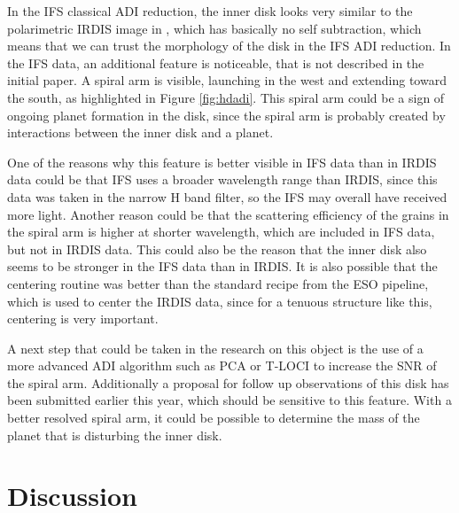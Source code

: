 \documentclass[twoside,single,12pt]{lion-msc}
\begin{document}
In the IFS classical ADI reduction, the inner disk looks very similar to the polarimetric IRDIS image in \citep{Ginski2016}, which has basically no self subtraction, which means that we can trust the morphology of the disk in the IFS ADI reduction. In the IFS data, an additional feature is noticeable, that is not described in the initial paper. A spiral arm is visible, launching in the west and extending toward the south, as highlighted in Figure \ref{fig:hdadi}. This spiral arm could be a sign of ongoing planet formation in the disk, since the spiral arm is probably created by interactions between the inner disk and a planet.
\bigskip

One of the reasons why this feature is better visible in IFS data than in IRDIS data could be that IFS uses a broader wavelength range than IRDIS, since this data was taken in the narrow H band filter, so the IFS may overall have received more light. Another reason could be that the scattering efficiency of the grains in the spiral arm is higher at shorter wavelength, which are included in IFS data, but not in IRDIS data. This could also be the reason that the inner disk also seems to be stronger in the IFS data than in IRDIS. It is also possible that the centering routine was better than the standard recipe from the ESO pipeline, which is used to center the IRDIS data, since for a tenuous structure like this, centering is very important. 
\bigskip

A next step that could be taken in the research on this object is the use of a more advanced ADI algorithm such as PCA or T-LOCI to increase the SNR of the spiral arm. Additionally a proposal for follow up observations of this disk has been submitted earlier this year, which should be sensitive to this feature. With a better resolved spiral arm, it could be possible to determine the mass of the planet that is disturbing the inner disk.

\chapter{Discussion}
\end{document}
